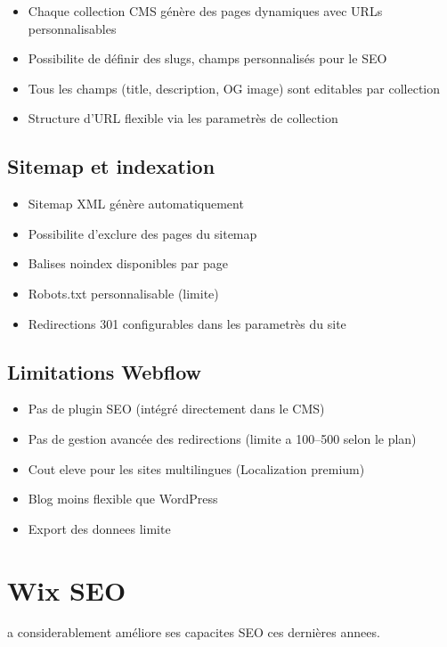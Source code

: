 \begin{itemize}
    \item Chaque collection CMS génère des pages dynamiques avec URLs personnalisables
    \item Possibilite de définir des slugs, champs personnalisés pour le SEO
    \item Tous les champs (title, description, OG image) sont editables par collection
    \item Structure d'URL flexible via les parametrès de collection
\end{itemize}

\subsection{Sitemap et indexation}

\begin{itemize}
    \item Sitemap XML génère automatiquement
    \item Possibilite d'exclure des pages du sitemap
    \item Balises noindex disponibles par page
    \item Robots.txt personnalisable (limite)
    \item Redirections 301 configurables dans les parametrès du site
\end{itemize}

\subsection{Limitations Webflow}

\begin{itemize}
    \item Pas de plugin SEO (intégré directement dans le CMS)
    \item Pas de gestion avancée des redirections (limite a 100--500 selon le plan)
    \item Cout eleve pour les sites multilingues (Localization premium)
    \item Blog moins flexible que WordPress
    \item Export des donnees limite
\end{itemize}

\section{Wix SEO}

 a considerablement améliore ses capacites SEO ces dernières annees.

